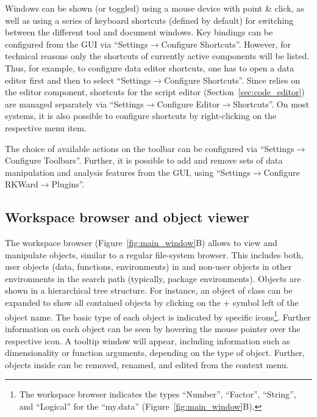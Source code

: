 Windows can be shown (or toggled) using a mouse device with point \&
click, as well as using a series of keyboard shortcuts (defined by
default) for switching between the different tool and document windows.
Key bindings can be configured from the GUI via ``Settings$\rightarrow$Configure Shortcuts''. 
However, for technical reasons only the shortcuts of currently active components 
will be listed. Thus, for example, to
configure data editor shortcuts, one has to open a data editor first and
then to select ``Settings$\rightarrow$Configure Shortcuts''. Since  relies on the 
 editor component,
shortcuts for the script editor (Section~\ref{sec:code_editor}) are managed separately via 
``Settings$\rightarrow$Configure Editor$\rightarrow$Shortcuts''. On most systems, it is also
possible to configure shortcuts by right-clicking on the respective
menu item.

The choice of available actions on the toolbar can be
configured via ``Settings$\rightarrow$Configure Toolbars''. Further, it is possible to add and remove sets
of data manipulation and analysis features from the GUI, using
``Settings$\rightarrow$Configure RKWard$\rightarrow$Plugins''.

\subsection{Workspace browser and object viewer}
\label{sec:workspace_browser_object_viewer}

The workspace browser (Figure~\ref{fig:main_window}B) allows to view
and manipulate  objects, similar
to a regular file-system browser. This includes both, user objects
(data, functions, environments) in  and non-user objects in other environments in the
 search path (typically,
 package environments). Objects are shown
in a hierarchical tree structure. For instance, an object of class
 can be expanded to show all contained objects 
by clicking on the $+$ symbol left of the object name.
The basic type of each object is indicated by specific icons\footnote{The workspace browser 
indicates the types ``Number'', ``Factor'', ``String'', and ``Logical'' for the  
``my.data'' (Figure~\ref{fig:main_window}B).}. 
Further information on each object can be seen by hovering the mouse
pointer over the respective icon. A tooltip window will appear,
including information such as dimensionality or function arguments,
depending on the type of object. Further, objects inside  can be
removed, renamed, and edited from the context menu.

